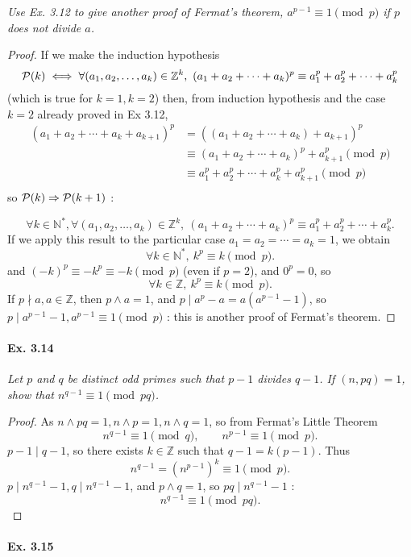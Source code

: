 \documentclass[11pt,a4paper]{article}
\newcommand{\Z}{\mathbb{Z}}
\newcommand{\N}{\mathbb{N}}
\begin{document}
{{\it Use Ex. 3.12 to give another proof of Fermat's theorem, $a^{p-1} \equiv 1 \pmod p$ if $p$ does not divide $a$.
}

\begin{proof}
If we make the induction hypothesis 
$${\cal P}(k) \iff \forall (a_1,a_2,\ldots,a_k) \in \Z^k,\  (a_1+a_2+\cdots+a_k)^p \equiv a_1^p+a_2^p+\cdots+a_k^p$$
(which is true for $k=1,k=2$)
then, from induction hypothesis and the case $k=2$ already proved in Ex 3.12,
\begin{align*}
(a_1+a_2+\cdots+a_k+a_{k+1})^p &= ((a_1+a_2+\cdots+a_k) +a_{k+1})^p\\
&\equiv (a_1+a_2+\cdots+a_k)^p + a_{k+1}^p \pmod p\\
&\equiv a_1^p+a_2^p+\cdots+a_k^p+ a_{k+1}^p \pmod p\\
\end{align*}
so ${\cal P}(k) \Rightarrow {\cal P}(k+1)$ :

$$\forall k \in \N^*, \forall (a_1,a_2,\ldots,a_k) \in \Z^k,\  (a_1+a_2+\cdots+a_k)^p \equiv a_1^p+a_2^p+\cdots+a_k^p.$$
If we apply this result to the particular case $a_1=a_2=\cdots = a_k = 1$, we obtain
$$\forall k \in \N^*,\ k^p \equiv k \pmod p.$$
and $(-k)^p \equiv - k^p \equiv -k \pmod p$ (even if $p=2$), and $0^p =0$, so
$$\forall k \in \Z,\ k^p \equiv k \pmod p.$$
If $p \nmid a, a \in \Z$, then $p\wedge a = 1$, and $p \mid a^p-a = a(a^{p-1} - 1)$, so $p \mid a^{p-1} - 1, a^{p-1} \equiv 1 \pmod p$ : this is another proof of Fermat's theorem.
\end{proof}

\paragraph{Ex. 3.14}

{\it Let $p$ and $q$ be distinct odd primes such that $p - 1$ divides $q -1$. If $(n, pq) = 1$, show that $n^{q - 1} \equiv 1 \pmod {pq}$.
}

\begin{proof}
As $n \wedge pq = 1, n\wedge p=1, n \wedge q = 1$, so from Fermat's Little Theorem
$$n^{q-1} \equiv 1 \pmod q,\qquad n^{p-1} \equiv 1 \pmod p.$$
$p-1 \mid q-1$, so there exists $k \in \Z$ such that $q-1 = k(p-1)$.
Thus
$$n^{q-1} = (n^{p-1})^k \equiv 1 \pmod p.$$
$p \mid n^{q-1} - 1, q \mid n^{q-1} - 1$, and $p\wedge q = 1$, so $pq \mid n^{q-1} - 1$ :
$$n^{q-1} \equiv 1 \pmod{pq}.$$
\end{proof}

\paragraph{Ex. 3.15}

}
\end{document}
